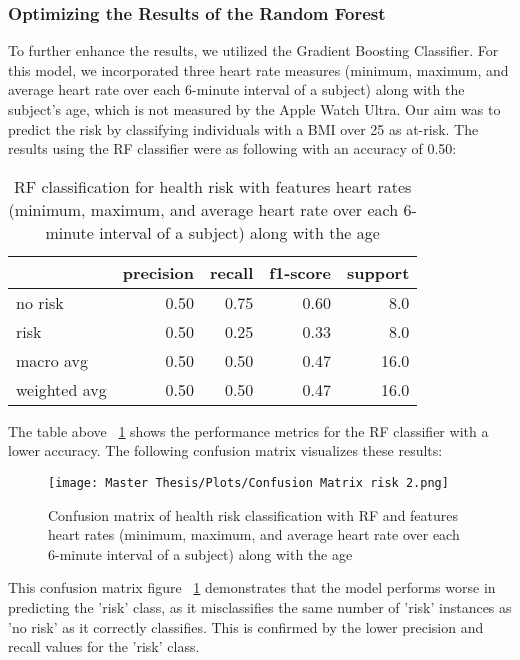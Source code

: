 \subsubsection*{Optimizing the Results of the Random Forest}

To further enhance the results, we utilized the Gradient Boosting Classifier. For this model, we incorporated three heart rate measures (minimum, maximum, and average heart rate over each 6-minute interval of a subject) along with the subject's age, which is not measured by the Apple Watch Ultra. Our aim was to predict the risk by classifying individuals with a BMI over 25 as at-risk. The results using the RF classifier were as following with an accuracy of 0.50:

\begin{table}[H]
\centering
\begin{tabular}{lrrrr}
\toprule
{} & precision & recall & f1-score & support \\
\midrule
no risk & 0.50 & 0.75 & 0.60 & 8.0 \\
risk & 0.50 & 0.25 & 0.33 & 8.0 \\
macro avg & 0.50 & 0.50 & 0.47 & 16.0 \\
weighted avg & 0.50 & 0.50 & 0.47 & 16.0 \\
\bottomrule
\end{tabular}
\caption{RF classification for health risk with features heart rates (minimum, maximum, and average heart rate over each 6-minute interval of a subject) along with the age}
\label{table:thirdtryclass}
\end{table}
The table above ~\ref{table:thirdtryclass} shows the performance metrics for the RF classifier with a lower accuracy. The following confusion matrix visualizes these results:
\FloatBarrier
\begin{figure}[h!]
\centering
\texttt{[image: Master Thesis/Plots/Confusion Matrix risk 2.png]}
\caption{Confusion matrix of health risk classification with RF and features heart rates (minimum, maximum, and average heart rate over each 6-minute interval of a subject) along with the age}
\label{fig:ConfusionMatrixrisk2}
\end{figure}
\FloatBarrier

This confusion matrix figure ~\ref{fig:ConfusionMatrixrisk2} demonstrates that the model performs worse in predicting the 'risk' class, as it misclassifies the same number of 'risk' instances as 'no risk' as it correctly classifies. This is confirmed by the lower precision and recall values for the 'risk' class.

